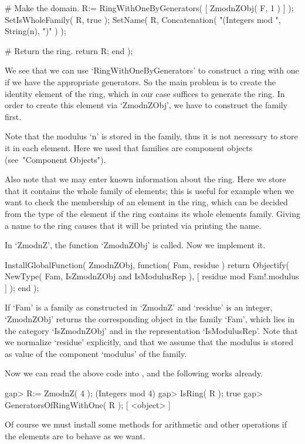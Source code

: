         # Make the domain.
        R:= RingWithOneByGenerators( [ ZmodnZObj( F, 1 ) ] );
        SetIsWholeFamily( R, true );
        SetName( R, Concatenation( "(Integers mod ", String(n), ")" ) );

        # Return the ring.
        return R;
    end );
\endtt

We see that we can use `RingWithOneByGenerators' to construct a ring
with one if we have the appropriate generators.
So the main problem is to create the identity element of the ring,
which in our case suffices to generate the ring.
In order to create this element via `ZmodnZObj',
we have to construct the family first.

Note that the modulus `n' is stored in the family,
thus it is not necessary to store it in each element.
Here we used that families are component objects
(see~"Component Objects").

Also note that we may enter known information about the ring.
Here we store that it contains the whole family of elements;
this is useful for example when we want to check the membership of an
element in the ring, which can be decided from the type of the element
if the ring contains its whole elements family.
Giving a name to the ring causes that it will be printed
via printing the name.

In `ZmodnZ', the function `ZmodnZObj' is called.
Now we implement it.

\begintt
    InstallGlobalFunction( ZmodnZObj, function( Fam, residue )
        return Objectify( NewType( Fam, IsZmodnZObj and IsModulusRep ),
                          [ residue mod Fam!.modulus ] );
    end );
\endtt

If `Fam' is a family as constructed in `ZmodnZ'
and `residue' is an integer,
`ZmodnZObj' returns the corresponding object in the family `Fam',
which lies in the category `IsZmodnZObj' and in the representation
`IsModulusRep'.
Note that we normalize `residue' explicitly,
and that we assume that the modulus is stored as value of the component
`modulus' of the family.

Now we can read the above code into {\GAP},
and the following works already.

\begintt
    gap> R:= ZmodnZ( 4 );
    (Integers mod 4)
    gap> IsRing( R );
    true
    gap> GeneratorsOfRingWithOne( R );
    [ <object> ]
\endtt

Of course we must install some methods for arithmetic and other
operations if the elements are to behave as we want.

